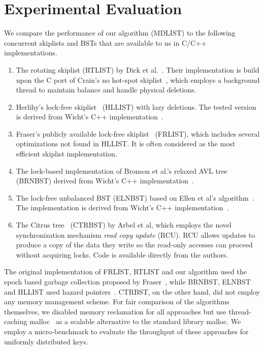 \documentclass[10pt,conference,compsocconf]{IEEEtran}
\begin{document}
\section{Experimental Evaluation}
\label{sec:experiment}
We compare the performance of our algorithm (MDLIST) to the following concurrent skiplists and BSTs that are available to us in C/C++ implementations.
\begin{enumerate}
    \item The rotating skiplist (RTLIST) by Dick et al.~\cite{dick2014logarithmic}. Their implementation is build upon the C port of Crain's no hot-spot skiplist~\cite{crain2013no}, which employs a background thread to maintain balance and handle physical deletions.
    \item Herlihy's lock-free skiplist~\cite{herlihy2012art} (HLLIST) with lazy deletions. The tested version is derived from Wicht's C++ implementation~\cite{wicht2012binary}.
    \item Fraser's publicly available lock-free skiplist~\cite{fraser2004practical} (FRLIST), which includes several optimizations not found in HLLIST. It is often considered as the most efficient skiplist implementation.
    \item The lock-based implementation of Bronson et al.'s relaxed AVL tree~\cite{bronson2010practical} (BRNBST) derived from Wicht's C++ implementation~\cite{wicht2012binary}.
    \item The lock-free unbalanced BST (ELNBST) based on Ellen et al's algorithm~\cite{ellen2010non}. The implementation is derived from Wicht's C++ implementation~\cite{wicht2012binary}.
    \item The Citrus tree~\cite{arbel2014concurrent} (CTRBST) by Arbel et al, which employs the novel synchronization mechanism \emph{read copy update} (RCU). RCU allows updates to produce a copy of the data they write so the read-only accesses can proceed without acquiring locks. Code is available directly from the authors.
\end{enumerate}
The original implementation of FRLIST, RTLIST and our algorithm used the epoch based garbage collection proposed by Fraser~\cite{fraser2004practical}, while BRNBST, ELNBST and HLLIST used hazard pointers~\cite{michael2004hazard}.
CTRBST, on the other hand, did not employ any memory management scheme.
For fair comparison of the algorithms themselves, we disabled memory reclamation for all approaches but use thread-caching malloc~\cite{ghemawat2009tcmalloc} as a scalable alternative to the standard library malloc.
We employ a micro-benchmark to evaluate the throughput of these approaches for uniformly distributed keys.
\end{document}
